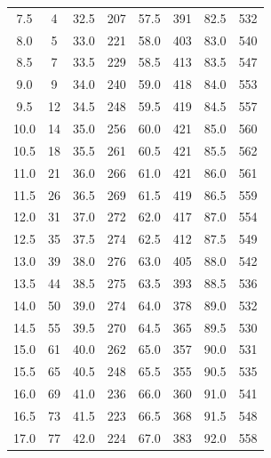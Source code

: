 {\begin{longtable}{cccccccc}
7.5 & 4 & 32.5 & 207 & 57.5 & 391 & 82.5 & 532 \\

8.0 & 5 & 33.0 & 221 & 58.0 & 403 & 83.0 & 540 \\

8.5 & 7 & 33.5 & 229 & 58.5 & 413 & 83.5 & 547 \\

9.0 & 9 & 34.0 & 240 & 59.0 & 418 & 84.0 & 553 \\

9.5 & 12 & 34.5 & 248 & 59.5 & 419 & 84.5 & 557 \\

10.0 & 14 & 35.0 & 256 & 60.0 & 421 & 85.0 & 560 \\

10.5 & 18 & 35.5 & 261 & 60.5 & 421 & 85.5 & 562 \\

11.0 & 21 & 36.0 & 266 & 61.0 & 421 & 86.0 & 561 \\

11.5 & 26 & 36.5 & 269 & 61.5 & 419 & 86.5 & 559 \\

12.0 & 31 & 37.0 & 272 & 62.0 & 417 & 87.0 & 554 \\

12.5 & 35 & 37.5 & 274 & 62.5 & 412 & 87.5 & 549 \\

13.0 & 39 & 38.0 & 276 & 63.0 & 405 & 88.0 & 542 \\

13.5 & 44 & 38.5 & 275 & 63.5 & 393 & 88.5 & 536 \\

14.0 & 50 & 39.0 & 274 & 64.0 & 378 & 89.0 & 532 \\

14.5 & 55 & 39.5 & 270 & 64.5 & 365 & 89.5 & 530 \\

15.0 & 61 & 40.0 & 262 & 65.0 & 357 & 90.0 & 531 \\

15.5 & 65 & 40.5 & 248 & 65.5 & 355 & 90.5 & 535 \\

16.0 & 69 & 41.0 & 236 & 66.0 & 360 & 91.0 & 541 \\

16.5 & 73 & 41.5 & 223 & 66.5 & 368 & 91.5 & 548 \\

17.0 & 77 & 42.0 & 224 & 67.0 & 383 & 92.0 & 558 \\


\end{longtable}}
